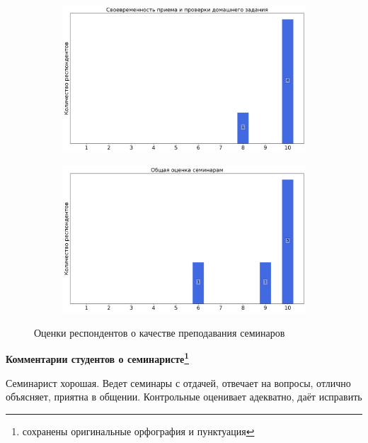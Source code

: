\begin{figure}[H]
\begin{subfigure}[b]{0.45\textwidth}
                \includegraphics[width=\textwidth]{images/4 course/Защита информации/seminarists-marks-Полешко А.-2.png}
            \end{subfigure}
            \begin{subfigure}[b]{0.45\textwidth}
                \centering
                \includegraphics[width=\textwidth]{images/4 course/Защита информации/seminarists-marks-Полешко А.-3.png}
            \end{subfigure}	
            \caption{Оценки респондентов о качестве преподавания семинаров}
        \end{figure}

        \textbf{Комментарии студентов о семинаристе\protect\footnote{сохранены оригинальные орфография и пунктуация}}
            \begin{commentbox} 
                Семинарист хорошая. Ведет семинары с отдачей, отвечает на вопросы, отлично объясняет, приятна в общении.
                Контрольные оценивает адекватно, даёт исправить 
            \end{commentbox} 
        
